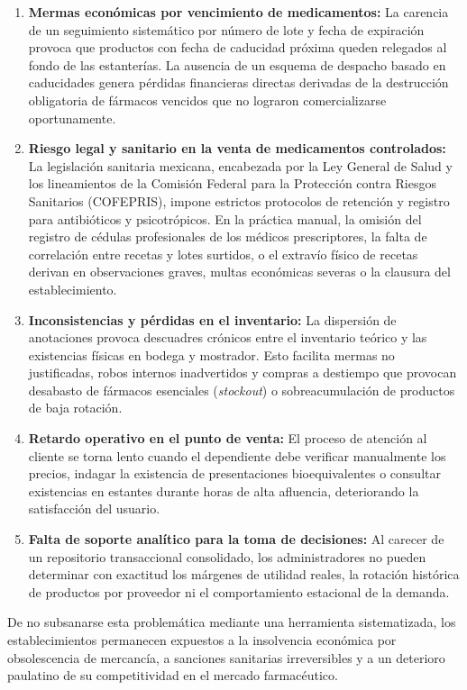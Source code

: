 \begin{enumerate}
    \item \textbf{Mermas económicas por vencimiento de medicamentos:} La carencia de un seguimiento sistemático por número de lote y fecha de expiración provoca que productos con fecha de caducidad próxima queden relegados al fondo de las estanterías. La ausencia de un esquema de despacho basado en caducidades genera pérdidas financieras directas derivadas de la destrucción obligatoria de fármacos vencidos que no lograron comercializarse oportunamente.
    \item \textbf{Riesgo legal y sanitario en la venta de medicamentos controlados:} La legislación sanitaria mexicana, encabezada por la Ley General de Salud y los lineamientos de la Comisión Federal para la Protección contra Riesgos Sanitarios (COFEPRIS), impone estrictos protocolos de retención y registro para antibióticos y psicotrópicos. En la práctica manual, la omisión del registro de cédulas profesionales de los médicos prescriptores, la falta de correlación entre recetas y lotes surtidos, o el extravío físico de recetas derivan en observaciones graves, multas económicas severas o la clausura del establecimiento.
    \item \textbf{Inconsistencias y pérdidas en el inventario:} La dispersión de anotaciones provoca descuadres crónicos entre el inventario teórico y las existencias físicas en bodega y mostrador. Esto facilita mermas no justificadas, robos internos inadvertidos y compras a destiempo que provocan desabasto de fármacos esenciales (\textit{stockout}) o sobreacumulación de productos de baja rotación.
    \item \textbf{Retardo operativo en el punto de venta:} El proceso de atención al cliente se torna lento cuando el dependiente debe verificar manualmente los precios, indagar la existencia de presentaciones bioequivalentes o consultar existencias en estantes durante horas de alta afluencia, deteriorando la satisfacción del usuario.
    \item \textbf{Falta de soporte analítico para la toma de decisiones:} Al carecer de un repositorio transaccional consolidado, los administradores no pueden determinar con exactitud los márgenes de utilidad reales, la rotación histórica de productos por proveedor ni el comportamiento estacional de la demanda.
\end{enumerate}

De no subsanarse esta problemática mediante una herramienta sistematizada, los establecimientos permanecen expuestos a la insolvencia económica por obsolescencia de mercancía, a sanciones sanitarias irreversibles y a un deterioro paulatino de su competitividad en el mercado farmacéutico.

